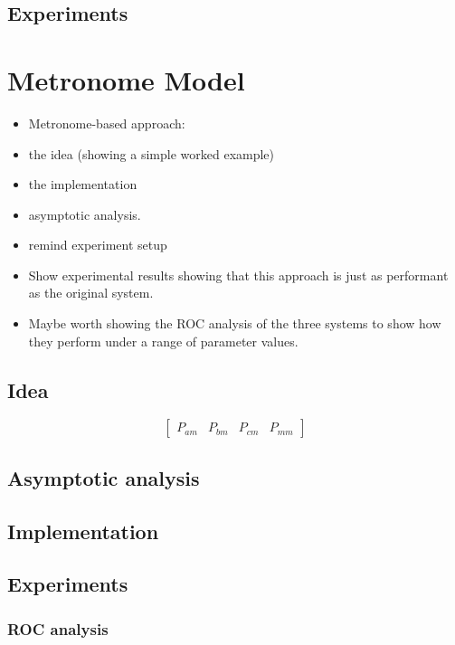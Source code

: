 \documentclass[11pt, a4paper]{report}
\begin{document}
\section{Experiments}

\chapter{Metronome Model}
\label{cha:metronome-model}

\begin{itemize}
\item Metronome-based approach:
\item the idea (showing a simple worked
  example)
\item the implementation
\item asymptotic analysis.
\item remind experiment setup
\item Show experimental results showing that this approach is just as
  performant as the original system.
\item Maybe worth showing the ROC analysis of the three systems to show
  how they perform under a range of parameter values.
\end{itemize}

\section{Idea}

%
%
\[
\begin{bmatrix}
  P_{am} & P_{bm} & P_{cm} & P_{mm}
\end{bmatrix}
\]

\section{Asymptotic analysis}
\section{Implementation}
\section{Experiments}
\subsection{ROC analysis}
\end{document}
